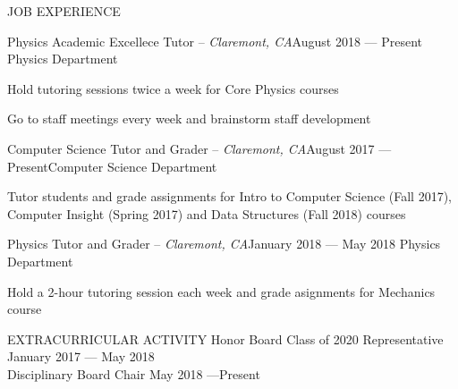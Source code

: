 \documentclass{resume} %
\begin{document}
\begin{rSection}{JOB EXPERIENCE}
\begin{rSubsection}{Physics Academic Excellece Tutor -- {\it Claremont, CA}}{August 2018 --- Present}
{Physics Department}

\item Hold tutoring sessions twice a week for Core Physics courses
\item Go to staff meetings every week and brainstorm staff development
\end{rSubsection}
\begin{rSubsection}{Computer Science Tutor and Grader -- {\it Claremont, CA}}{August 2017 --- Present}{Computer Science Department}

\item Tutor students and grade assignments for Intro to Computer Science (Fall 2017), Computer Insight (Spring 2017) and Data Structures (Fall 2018) courses
\end{rSubsection}
\begin{rSubsection}{Physics Tutor and Grader -- {\it Claremont, CA}}{January 2018 --- May 2018}
{Physics Department}

\item Hold a 2-hour tutoring session each week and grade asignments for Mechanics course
\end{rSubsection}
\end{rSection}
\begin{rSection}{EXTRACURRICULAR ACTIVITY}
Honor Board Class of 2020 Representative \hfill {January 2017 --- May 2018}\\
Disciplinary Board Chair \hfill {May 2018 ---Present}
\end{rSection}

\end{document}
